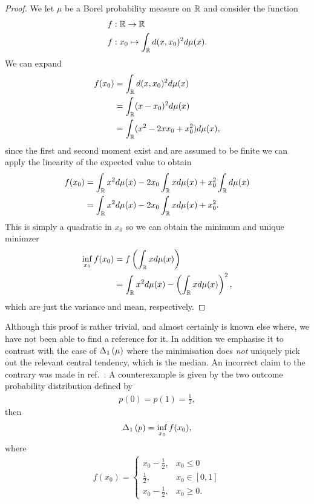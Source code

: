 \begin{proof}
  We let $\mu$ be a Borel probability measure on $\mathbb{R}$ and consider the function
  \begin{align}
    f&:\mathbb{R}\to\mathbb{R}\\
    f&:x_0\mapsto \int_{\mathbb{R}} d(x,x_0)^2 d\mu(x).
  \end{align}
  We can expand 
  \begin{align}
    f(x_0) &= \int_{\mathbb{R}} d(x,x_0)^2 d\mu(x)\\
           &= \int_{\mathbb{R}} (x - x_0)^2 d\mu(x)\\
           &= \int_{\mathbb{R}} (x^2 - 2x x_0 + x_0^2) d\mu(x),
  \end{align}
  since the first and second moment exist and are assumed to be finite we can apply the linearity of the expected value to obtain
  \begin{align}
    f(x_0) &= \int_{\mathbb{R}} x^2d\mu(x) - 2x_0 \int_{\mathbb{R}} x d\mu(x) + x_0^2\int_{\mathbb{R}} d\mu(x)\\
           &= \int_{\mathbb{R}} x^2d\mu(x) - 2x_0 \int_{\mathbb{R}} x d\mu(x) + x_0^2.
  \end{align}
  This is simply a quadratic in $x_0$ so we can obtain the minimum and unique minimzer
  \begin{align}
    \inf_{x_0}f(x_0) &= f\left(\int_{\mathbb{R}} x d\mu(x)\right)\\
                    &= \int_{\mathbb{R}} x^2d\mu(x) - \left(\int_{\mathbb{R}} x d\mu(x)\right)^2,
  \end{align}
  which are just the variance and mean, respectively.
\end{proof}
Although this proof is rather trivial, and almost certainly is known else where, we have not been able to find a reference for it. In addition we emphasise it to contrast with the case of $\wsDev{\mu}[1]$ where the minimisation does \emph{not} uniquely pick out the relevant central tendency, which is the median. An incorrect claim to the contrary was made in ref.~\cite{blw-meas-uncertainty}. A counterexample is given by the two outcome probability distribution defined by
\begin{align}
  p(0) = p(1) = \frac{1}{2},
\end{align}
then 
\begin{align}
  \wsDev{p}[1] = \inf_{x_0} f(x_0),
\end{align}
where
\begin{align}
  f(x_0) = \begin{cases}x_0 - \frac{1}{2}, &x_0 \leq 0\\ \frac{1}{2}, & x_0\in [0,1] \\ x_0 - \frac{1}{2}, & x_0 \geq 0. \end{cases}
\end{align}
